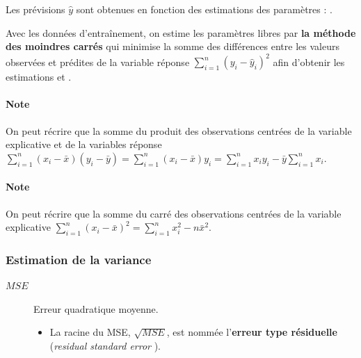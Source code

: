 \documentclass[french]{article}
\begin{document}
\begin{multicols*}{2}
\begin{definitionNOHFILL}
Les prévisions $\hat{y}$ sont obtenues en fonction des estimations des paramètres : . 

\bigskip

Avec les données d'entraînement, on estime les paramètres libres par \textbf{la méthode des moindres carrés} qui minimise la somme des différences entre les valeurs observées et prédites de la variable réponse $\sum_{i = 1}^{n} \left(y_{i} - \hat{y}_{i}\right)^{2}$ afin d'obtenir les estimations  et .
\end{definitionNOHFILL}

\paragraph{Note}	On peut récrire que la somme du produit des observations centrées de la variable explicative et de la variables réponse $\sum_{i = 1}^{n} (x_{i} - \bar{x})(y_{i} - \bar{y}) = \sum_{i = 1}^{n} (x_{i} - \bar{x})y_{i} = \sum_{i = 1}^{n} x_{i}y_{i} - \bar{y}\sum_{i = 1}^{n}x_{i}$.

\paragraph{Note}	On peut récrire que la somme du carré des observations centrées de la variable explicative $\sum_{i = 1}^{n} (x_{i} - \bar{x})^{2} = \sum_{i = 1}^{n} x_{i}^{2} - n\bar{x}^{2}$.




\subsubsection{Estimation de la variance}
\begin{distributions}[Notation]
\begin{description}
	\item[$MSE$]	Erreur quadratique moyenne.
		\begin{itemize}
		\item	La racine du MSE, $\sqrt{MSE}$, est nommée l'\textbf{erreur type résiduelle} (\og \textit{residual standard error} \fg{}).
		\end{itemize}
\end{description}
\end{distributions}



\end{multicols*}
\end{document}
